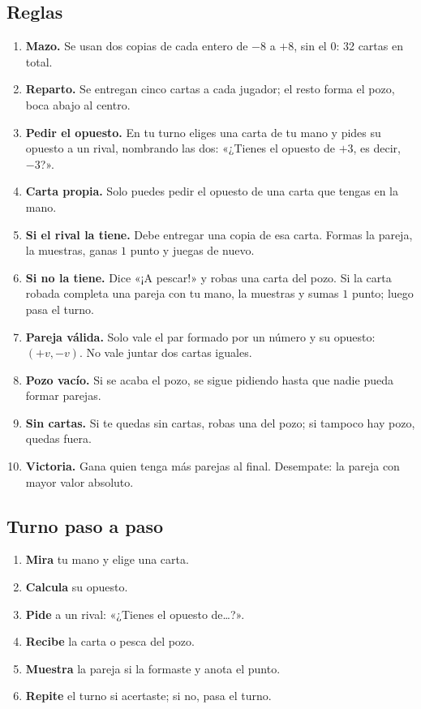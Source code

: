 \documentclass[12pt, letterpaper]{article}
\begin{document}
\subsection{Reglas}

\begin{enumerate}[leftmargin=*]
  \item \textbf{Mazo.} Se usan dos copias de cada entero de $-8$ a $+8$, sin el $0$: 32 cartas en total.
  \item \textbf{Reparto.} Se entregan cinco cartas a cada jugador; el resto forma el pozo, boca abajo al centro.
  \item \textbf{Pedir el opuesto.} En tu turno eliges una carta de tu mano y pides su opuesto a un rival, nombrando las dos: «¿Tienes el opuesto de $+3$, es decir, $-3$?».
  \item \textbf{Carta propia.} Solo puedes pedir el opuesto de una carta que tengas en la mano.
  \item \textbf{Si el rival la tiene.} Debe entregar una copia de esa carta. Formas la pareja, la muestras, ganas $1$ punto y juegas de nuevo.
  \item \textbf{Si no la tiene.} Dice «¡A pescar!» y robas una carta del pozo. Si la carta robada completa una pareja con tu mano, la muestras y sumas $1$ punto; luego pasa el turno.
  \item \textbf{Pareja válida.} Solo vale el par formado por un número y su opuesto: $(+v,-v)$. No vale juntar dos cartas iguales.
  \item \textbf{Pozo vacío.} Si se acaba el pozo, se sigue pidiendo hasta que nadie pueda formar parejas.
  \item \textbf{Sin cartas.} Si te quedas sin cartas, robas una del pozo; si tampoco hay pozo, quedas fuera.
  \item \textbf{Victoria.} Gana quien tenga más parejas al final. Desempate: la pareja con mayor valor absoluto.
\end{enumerate}

\subsection{Turno paso a paso}

\begin{enumerate}[leftmargin=*]
  \item \textbf{Mira} tu mano y elige una carta.
  \item \textbf{Calcula} su opuesto.
  \item \textbf{Pide} a un rival: «¿Tienes el opuesto de…?».
  \item \textbf{Recibe} la carta o pesca del pozo.
  \item \textbf{Muestra} la pareja si la formaste y anota el punto.
  \item \textbf{Repite} el turno si acertaste; si no, pasa el turno.
\end{enumerate}
\end{document}
